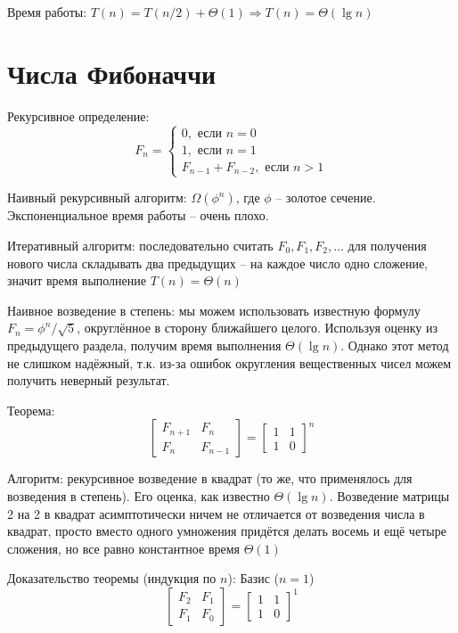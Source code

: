 \documentclass[a4paper,11pt]{article}
\begin{document}
Время работы: $T(n) = T(n/2) + \Theta(1) \Rightarrow T(n) = \Theta(\lg n)$

\section{Числа Фибоначчи}

Рекурсивное определение:
\begin{equation*}
  F_n = \begin{cases}
    0, \text{ если } n = 0 \\
    1, \text{ если } n = 1 \\
    F_{n-1} + F_{n-2}, \text{ если } n > 1
  \end{cases}
\end{equation*}

Наивный рекурсивный алгоритм: $\Omega(\phi^n)$, где $\phi$ -- золотое сечение.
Экспоненциальное время работы -- очень плохо.

Итеративный алгоритм: последовательно считать $F_0, F_1, F_2, \ldots$ для
получения нового числа складывать два предыдущих -- на каждое число одно
сложение, значит время выполнение $T(n) = \Theta(n)$

Наивное возведение в степень: мы можем использовать известную формулу $F_n =
\phi^n / \sqrt{5}$, округлённое в сторону ближайшего целого. Используя оценку из
предыдущего раздела, получим время выполнения $\Theta(\lg n)$. Однако этот метод
не слишком надёжный, т.к. из-за ошибок округления вещественных чисел можем
получить неверный результат.

Теорема:
\begin{equation*}
\begin{bmatrix}
  F_{n+1} & F_n \\
  F_n     & F_{n-1}
\end{bmatrix} =
\begin{bmatrix}
  1 & 1 \\
  1 & 0
\end{bmatrix}^n
\end{equation*}

Алгоритм: рекурсивное возведение в квадрат (то же, что применялось для
возведения в степень). Его оценка, как известно $\Theta(\lg n)$.
Возведение матрицы 2 на 2 в квадрат асимптотически ничем не отличается от
возведения числа в квадрат, просто вместо одного умножения придётся делать
восемь и ещё четыре сложения, но все равно константное время $\Theta(1)$

Доказательство теоремы (индукция по $n$):
Базис ($n=1$)
\begin{equation*}
\begin{bmatrix}
  F_2 & F_1 \\
  F_1 & F_0
\end{bmatrix} =
\begin{bmatrix}
  1 & 1 \\
  1 & 0
\end{bmatrix}^1
\end{equation*}
\end{document}
